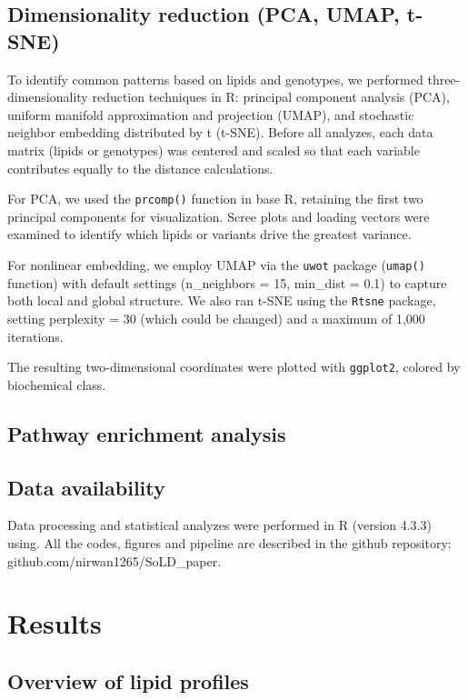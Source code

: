 \documentclass[10pt,letterpaper]{article}
\begin{document}
\subsection*{Dimensionality reduction (PCA, UMAP, t-SNE)}  
To identify common patterns based on lipids and genotypes, we performed three-dimensionality reduction techniques in R: principal component analysis (PCA), uniform manifold approximation and projection (UMAP), and stochastic neighbor embedding distributed by t (t-SNE).  Before all analyzes, each data matrix (lipids or genotypes) was centered and scaled so that each variable contributes equally to the distance calculations.

For PCA, we used the \texttt{prcomp()} function in base R, retaining the first two principal components for visualization.  Scree plots and loading vectors were examined to identify which lipids or variants drive the greatest variance.  

For nonlinear embedding, we employ UMAP via the \texttt{uwot} package (\texttt{umap()} function) with default settings (n\_neighbors = 15, min\_dist = 0.1) to capture both local and global structure.  We also ran t-SNE using the \texttt{Rtsne} package, setting perplexity = 30 (which could be changed) and a maximum of 1,000 iterations.  

The resulting two-dimensional coordinates were plotted with \texttt{ggplot2}, colored by biochemical class.

\subsection*{Pathway enrichment analysis}

\subsection*{Data availability}
Data processing and statistical analyzes were performed in R (version 4.3.3) using. All the codes, figures and pipeline are described in the github repository: github.com/nirwan1265/SoLD_paper.

\section*{Results}

\subsection*{Overview of lipid profiles}
\end{document}
